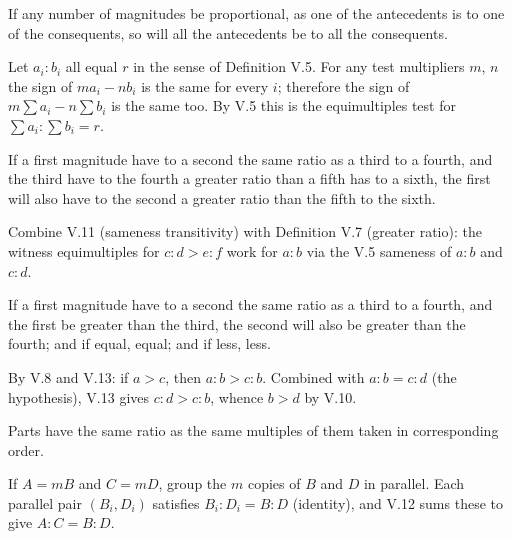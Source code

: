 \begin{claim}
\label{prop:V.12}
If any number of magnitudes be proportional, as one of the antecedents
is to one of the consequents, so will all the antecedents be to all
the consequents.
\end{claim}
\begin{evidence}[Proof of V.12]
\label{ev:V.12}
Let $a_i : b_i$ all equal $r$ in the sense of Definition V.5.  For
any test multipliers $m$, $n$ the sign of $m a_i - n b_i$ is the same
for every $i$; therefore the sign of $m \sum a_i - n \sum b_i$ is the
same too.  By V.5 this is the equimultiples test for $\sum a_i : \sum
b_i = r$.
\end{evidence}

\begin{claim}
\label{prop:V.13}
If a first magnitude have to a second the same ratio as a third to a
fourth, and the third have to the fourth a greater ratio than a fifth
has to a sixth, the first will also have to the second a greater ratio
than the fifth to the sixth.
\end{claim}
\begin{evidence}[Proof of V.13]
\label{ev:V.13}
Combine V.11 (sameness transitivity) with Definition V.7 (greater
ratio): the witness equimultiples for $c:d > e:f$ work for $a:b$ via
the V.5 sameness of $a:b$ and $c:d$.
\end{evidence}

\begin{claim}
\label{prop:V.14}
If a first magnitude have to a second the same ratio as a third to a
fourth, and the first be greater than the third, the second will also
be greater than the fourth; and if equal, equal; and if less, less.
\end{claim}
\begin{evidence}[Proof of V.14]
\label{ev:V.14}
By V.8 and V.13: if $a > c$, then $a:b > c:b$.  Combined with $a:b =
c:d$ (the hypothesis), V.13 gives $c:d > c:b$, whence $b > d$ by V.10.
\end{evidence}

\begin{claim}
\label{prop:V.15}
Parts have the same ratio as the same multiples of them taken in
corresponding order.
\end{claim}
\begin{evidence}[Proof of V.15]
\label{ev:V.15}
If $A = mB$ and $C = mD$, group the $m$ copies of $B$ and $D$ in
parallel.  Each parallel pair $(B_i, D_i)$ satisfies $B_i : D_i = B :
D$ (identity), and V.12 sums these to give $A : C = B : D$.
\end{evidence}


